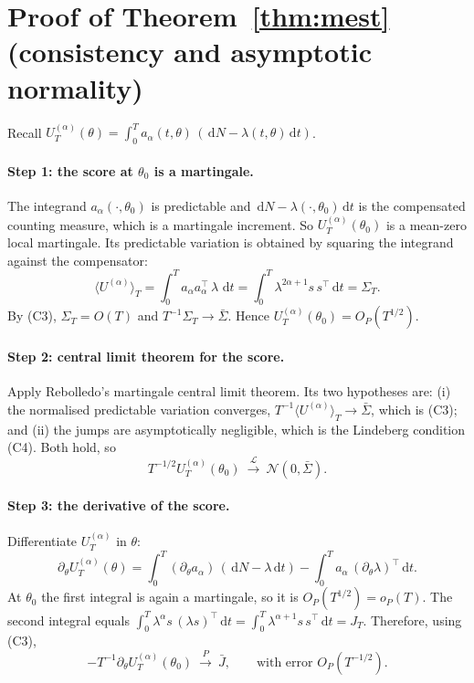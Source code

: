 \documentclass[smallextended,natbib]{svjour3}
\newcommand{\dd}{\,\mathrm{d}}
\newcommand{\toP}{\xrightarrow{P}}
\newcommand{\toL}{\xrightarrow{\mathcal{L}}}
\begin{document}
\section{Proof of Theorem~\ref{thm:mest} (consistency and asymptotic normality)}
\label{app:thm}
Recall $U_T^{(\alpha)}(\theta)=\int_0^T a_\alpha(t,\theta)\,(\dd N-\lambda(t,\theta)\dd t)$.

\paragraph{Step 1: the score at $\theta_0$ is a martingale.}
The integrand $a_\alpha(\cdot,\theta_0)$ is predictable and $\dd N-\lambda(\cdot,\theta_0)\dd t$
is the compensated counting measure, which is a martingale increment. So
$U_T^{(\alpha)}(\theta_0)$ is a mean-zero local martingale. Its predictable
variation is obtained by squaring the integrand against the compensator:
\[
\langle U^{(\alpha)}\rangle_T=\int_0^T a_\alpha a_\alpha^{\top}\,\lambda\,\dd t
=\int_0^T \lambda^{2\alpha+1}s\,s^{\top}\dd t=\Sigma_T .
\]
By (C3), $\Sigma_T=O(T)$ and $T^{-1}\Sigma_T\to\bar\Sigma$. Hence
$U_T^{(\alpha)}(\theta_0)=O_P(T^{1/2})$.

\paragraph{Step 2: central limit theorem for the score.}
Apply Rebolledo's martingale central limit theorem. Its two hypotheses are: (i)
the normalised predictable variation converges, $T^{-1}\langle U^{(\alpha)}\rangle_T\to\bar\Sigma$,
which is (C3); and (ii) the jumps are asymptotically negligible, which is the
Lindeberg condition (C4). Both hold, so
\[
T^{-1/2}U_T^{(\alpha)}(\theta_0)\ \toL\ \mathcal N(0,\bar\Sigma).
\]

\paragraph{Step 3: the derivative of the score.}
Differentiate $U_T^{(\alpha)}$ in $\theta$:
\[
\partial_\theta U_T^{(\alpha)}(\theta)=\int_0^T (\partial_\theta a_\alpha)\,(\dd N-\lambda\dd t)
-\int_0^T a_\alpha\,(\partial_\theta\lambda)^{\top}\dd t .
\]
At $\theta_0$ the first integral is again a martingale, so it is $O_P(T^{1/2})=o_P(T)$.
The second integral equals $\int_0^T \lambda^{\alpha}s\,(\lambda s)^{\top}\dd t=\int_0^T \lambda^{\alpha+1}s\,s^{\top}\dd t=J_T$.
Therefore, using (C3),
\[
-T^{-1}\partial_\theta U_T^{(\alpha)}(\theta_0)\ \toP\ \bar J,\qquad \text{with error }O_P(T^{-1/2}).
\]
\end{document}
